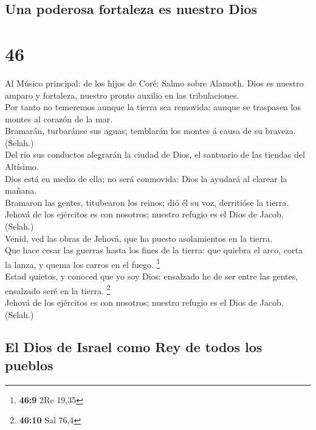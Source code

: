 \hypertarget{una-poderosa-fortaleza-es-nuestro-dios}{%
\subsection{Una poderosa fortaleza es nuestro
Dios}\label{una-poderosa-fortaleza-es-nuestro-dios}}

\hypertarget{section-45}{%
\section{46}\label{section-45}}

 Al Músico principal: de los hijos de Coré: Salmo sobre
Alamoth. Dios es nuestro amparo y fortaleza, nuestro pronto auxilio en
las tribulaciones.\\
 Por tanto no temeremos aunque la tierra sea removida;
aunque se traspasen los montes al corazón de la mar.\\
 Bramarán, turbaránse sus aguas; temblarán los montes á
causa de su braveza. (Selah.)\\
 Del río sus conductos alegrarán la ciudad de Dios, el
santuario de las tiendas del Altísimo.\\
 Dios está en medio de ella; no será conmovida: Dios la
ayudará al clarear la mañana.\\
 Bramaron las gentes, titubearon los reinos; dió él su voz,
derritióse la tierra.\\
 Jehová de los ejércitos es con nosotros; nuestro refugio es
el Dios de Jacob. (Selah.)\\
 Venid, ved las obras de Jehová, que ha puesto asolamientos
en la tierra.\\
 Que hace cesar las guerras hasta los fines de la tierra:
que quiebra el arco, corta la lanza, y quema los carros en el fuego.
\footnote{\textbf{46:9} 2Re 19,35}\\
 Estad quietos, y conoced que yo soy Dios: ensalzado he de
ser entre las gentes, ensalzado seré en la tierra. \footnote{\textbf{46:10}
  Sal 76,4}\\
 Jehová de los ejércitos es con nosotros; nuestro refugio
es el Dios de Jacob. (Selah.)

\hypertarget{el-dios-de-israel-como-rey-de-todos-los-pueblos}{%
\subsection{El Dios de Israel como Rey de todos los
pueblos}\label{el-dios-de-israel-como-rey-de-todos-los-pueblos}}

